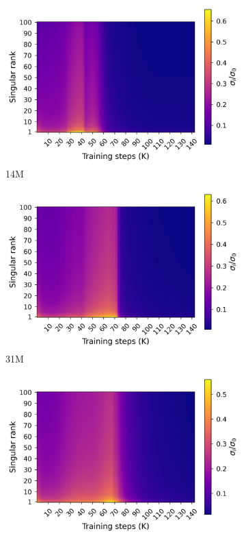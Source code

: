 \begin{figure}[ht!]
    \centering
    \begin{subfigure}{0.45\columnwidth}
         \includegraphics[width=\linewidth]{sources/part_1/softmax_bottleneck/imgs/sv_map_14m.png}
         \caption{14M}
         \label{fig:sv_14M}
    \end{subfigure}
    \begin{subfigure}{0.45\columnwidth}
         \includegraphics[width=\linewidth]{sources/part_1/softmax_bottleneck/imgs/sv_map_31m.png}
         \caption{31M}
         \label{fig:sv_31M}
    \end{subfigure}
    \begin{subfigure}{0.45\columnwidth}
         \includegraphics[width=\linewidth]{sources/part_1/softmax_bottleneck/imgs/sv_map_70m.png}

\end{subfigure}
\end{figure}
